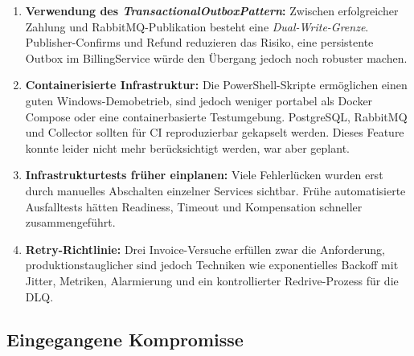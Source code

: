 \documentclass[10pt,a4paper]{article}
\newcommand{\midGap}{\vspace{12mm}}
\newcommand{\term}[1]{\textsf{\textbf{#1}}}
\begin{document}
\begin{enumerate}
  \item \term{Verwendung des \emph{TransactionalOutboxPattern}:} Zwischen erfolgreicher
    Zahlung und RabbitMQ-Publikation besteht eine \emph{Dual-Write-Grenze}.
    Publisher-Confirms und Refund reduzieren das Risiko, eine persistente
    Outbox im BillingService würde den Übergang jedoch noch robuster machen.  
  \item \term{Containerisierte Infrastruktur:} Die PowerShell-Skripte
    ermöglichen einen guten Windows-Demobetrieb, sind jedoch weniger portabel
    als Docker Compose oder eine containerbasierte Testumgebung. PostgreSQL,
    RabbitMQ und Collector sollten für CI reproduzierbar gekapselt werden. Dieses
		Feature konnte leider nicht mehr berücksichtigt werden, war aber geplant.
  \item \term{Infrastrukturtests früher einplanen:} Viele Fehlerlücken wurden
    erst durch manuelles Abschalten einzelner Services sichtbar. Frühe
    automatisierte Ausfalltests hätten Readiness, Timeout und Kompensation
    schneller zusammengeführt.
  \item \term{Retry-Richtlinie:} Drei Invoice-Versuche erfüllen zwar die 
		Anforderung, produktionstauglicher sind jedoch Techniken wie exponentielles Backoff mit Jitter,
		Metriken, Alarmierung und ein kontrollierter Redrive-Prozess für die DLQ.
\end{enumerate}

\midGap

\subsection{Eingegangene Kompromisse}
\end{document}
